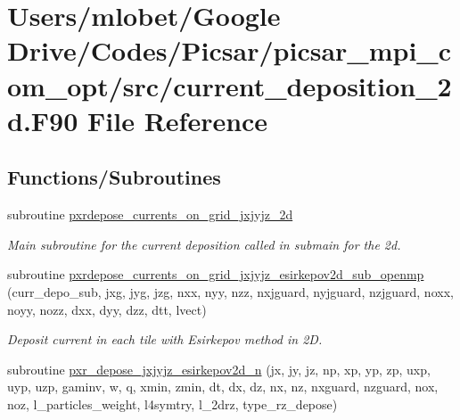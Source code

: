 \hypertarget{current__deposition__2d_8_f90}{}\section{Users/mlobet/\+Google Drive/\+Codes/\+Picsar/picsar\+\_\+mpi\+\_\+com\+\_\+opt/src/current\+\_\+deposition\+\_\+2d.F90 File Reference}
\label{current__deposition__2d_8_f90}
\subsection*{Functions/\+Subroutines}
\begin{DoxyCompactItemize}
\item 
subroutine \hyperlink{current__deposition__2d_8_f90_ad414bf8cb02772ebe516d5520ad22c95}{pxrdepose\+\_\+currents\+\_\+on\+\_\+grid\+\_\+jxjyjz\+\_\+2d}
\begin{DoxyCompactList}\small\item\em Main subroutine for the current deposition called in submain for the 2d. \end{DoxyCompactList}\item 
subroutine \hyperlink{current__deposition__2d_8_f90_a7384ad64cf4beca09ab1a45d8c323395}{pxrdepose\+\_\+currents\+\_\+on\+\_\+grid\+\_\+jxjyjz\+\_\+esirkepov2d\+\_\+sub\+\_\+openmp} (curr\+\_\+depo\+\_\+sub, jxg, jyg, jzg,                                                       nxx, nyy, nzz, nxjguard, nyjguard, nzjguard, noxx, noyy, nozz, dxx, dyy, dzz, dtt, lvect)
\begin{DoxyCompactList}\small\item\em Deposit current in each tile with Esirkepov method in 2D. \end{DoxyCompactList}\item 
subroutine \hyperlink{current__deposition__2d_8_f90_a8b3dd693be6a41b342722e15aa4880de}{pxr\+\_\+depose\+\_\+jxjyjz\+\_\+esirkepov2d\+\_\+n} (jx, jy, jz, np, xp, yp, zp, uxp, uyp, uzp, gaminv, w, q, xmin, zmin,                                                                                                                                                                                               dt, dx, dz, nx, nz, nxguard, nzguard,                                                                                                                                                                                               nox, noz, l\+\_\+particles\+\_\+weight, l4symtry, l\+\_\+2drz, type\+\_\+rz\+\_\+depose)

\end{DoxyCompactItemize}
